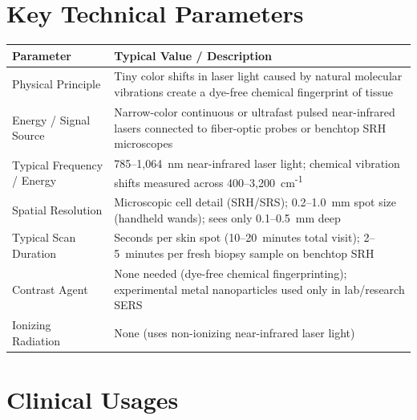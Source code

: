 \section{Key Technical Parameters}
\noindent
\begin{tabularx}{\textwidth}{@{}l X@{}}
\toprule
\textbf{Parameter} & \textbf{Typical Value / Description} \\
\midrule
Physical Principle & Tiny color shifts in laser light caused by natural molecular vibrations create a dye-free chemical fingerprint of tissue \\
Energy / Signal Source & Narrow-color continuous or ultrafast pulsed near-infrared lasers connected to fiber-optic probes or benchtop SRH microscopes \\
Typical Frequency / Energy & 785--1,064~nm near-infrared laser light; chemical vibration shifts measured across 400--3,200~cm\textsuperscript{-1} \\
Spatial Resolution & Microscopic cell detail (SRH/SRS); 0.2--1.0~mm spot size (handheld wands); sees only 0.1--0.5~mm deep \\
Typical Scan Duration & Seconds per skin spot (10--20~minutes total visit); 2--5~minutes per fresh biopsy sample on benchtop SRH \\
Contrast Agent & None needed (dye-free chemical fingerprinting); experimental metal nanoparticles used only in lab/research SERS \\
Ionizing Radiation & None (uses non-ionizing near-infrared laser light) \\
\bottomrule
\end{tabularx}

\section{Clinical Usages}

